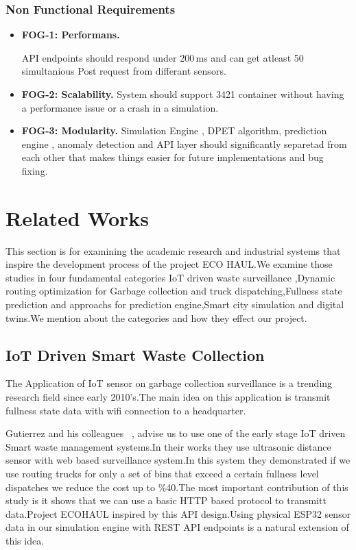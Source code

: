 \documentclass[12pt,a4paper]{report}
\begin{document}
\subsection{Non Functional Requirements}

\begin{itemize}[leftmargin=1.5cm]
  \item \textbf{FOG-1: Performans.}

        \indent API endpoints should respond under 200\,ms and can get atleast 50 simultanious Post request from differant sensors.
  \item \textbf{FOG-2: Scalability.}
        System should support 3421 container without having a performance issue or a crash in a simulation.
  \item \textbf{FOG-3: Modularity.}
        \indent Simulation Engine , DPET algorithm, prediction engine , anomaly detection and API layer should significantly separetad from each other that makes things easier for future implementations and bug fixing.

\end{itemize}

\chapter{Related Works}

\indent This section is for examining the academic research and industrial systems that inspire the development process of the project ECO HAUL.We examine those studies in four fundamental categories IoT driven waste surveillance ,Dynamic routing optimization for Garbage collection and truck dispatching,Fullness state prediction and approachs for prediction engine,Smart city simulation and digital twins.We mention about the categories and how they effect our project.
\section{IoT Driven Smart Waste Collection}

\indent The Application of IoT sensor on garbage collection surveillance is a trending research field since early 2010's.The main idea on this application is transmit fullness state data with  wifi connection to a headquarter.

\indent Gutierrez and his colleagues ~\cite{gutierrez2015}, advise us to use one of the early stage IoT driven Smart waste  management systems.In their works they use ultrasonic distance sensor with web based surveillance system.In this system they demonstrated if we use routing trucks for only a set of bins that exceed a certain fullness level dispatches we reduce the cost up to  \%40.The most important contribution of this study is it shows that we can use a basic HTTP based protocol to transmitt data.Project ECOHAUL inspired by this API design.Using physical ESP32 sensor data in our simulation engine with REST API endpoints is a natural extension of this idea.
\end{document}
